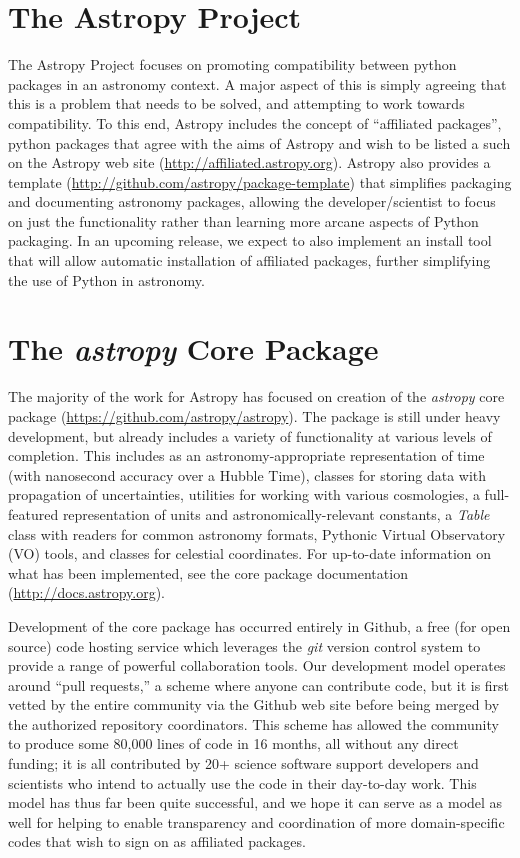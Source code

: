 \section{The Astropy Project}
The Astropy Project focuses on promoting compatibility between python packages in an astronomy context.  A major aspect of this is simply agreeing that this is a problem that needs to be solved, and attempting to work towards compatibility.  To this end, Astropy includes the concept of ``affiliated packages'', python packages that agree with the aims of Astropy and wish to be listed a such on the Astropy web site (\url{http://affiliated.astropy.org}).  Astropy also provides a template (\url{http://github.com/astropy/package-template}) that simplifies packaging and documenting astronomy packages, allowing the developer/scientist to focus on just the functionality rather than learning more arcane aspects of Python packaging.  In an upcoming release, we expect to also implement an install tool that will allow automatic installation of affiliated packages, further simplifying the use of Python in astronomy.

\section{The {\it astropy} Core Package} 
The majority of the work for Astropy has focused on creation of the {\it astropy} core package (\url{https://github.com/astropy/astropy}).  The package is still under heavy development, but already includes a variety of functionality at various levels of completion.  This includes as an astronomy-appropriate representation of time (with nanosecond accuracy over a Hubble Time), classes for storing data with propagation of uncertainties, utilities for working with various cosmologies, a full-featured representation of units and astronomically-relevant constants, a {\it Table} class with readers for common astronomy formats, Pythonic Virtual Observatory (VO) tools, and classes for celestial coordinates.  For up-to-date information on what has been implemented, see the core package documentation (\url{http://docs.astropy.org}).

Development of the core package has occurred entirely in Github, a free (for open source) code hosting service which leverages the {\it git} version control system to provide a range of powerful collaboration tools.  Our development model operates around ``pull requests,'' a scheme where anyone can contribute code, but it is first vetted by the entire community via the Github web site before being merged by the authorized repository coordinators. This scheme has allowed the community to produce some 80,000 lines of code in 16 months, all without any direct funding; it is all contributed by 20+  science software support developers and scientists who intend to actually use the code in their day-to-day work.  This model has thus far been quite successful, and we hope it can serve as a model as well for helping to enable transparency and coordination of more domain-specific codes that wish to sign on as affiliated packages.


